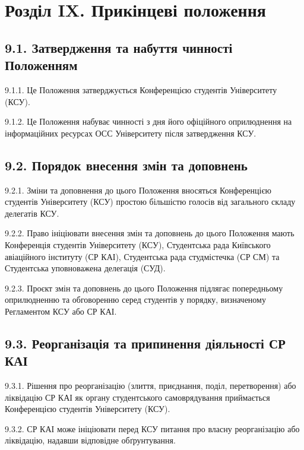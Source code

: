 \section*{Розділ IX. Прикінцеві положення}

\subsection*{9.1. Затвердження та набуття чинності Положенням}
    9.1.1. Це Положення затверджується Конференцією студентів Університету (КСУ).

    9.1.2. Це Положення набуває чинності з дня його офіційного оприлюднення на інформаційних ресурсах ОСС Університету після затвердження КСУ.

\subsection*{9.2. Порядок внесення змін та доповнень}
    9.2.1. Зміни та доповнення до цього Положення вносяться Конференцією студентів Університету (КСУ) простою більшістю голосів від загального складу делегатів КСУ.

    9.2.2. Право ініціювати внесення змін та доповнень до цього Положення мають Конференція студентів Університету (КСУ), Студентська рада Київського авіаційного інституту (СР КАІ), Студентська рада студмістечка (СР СМ) та Студентська уповноважена делегація (СУД).

    9.2.3. Проєкт змін та доповнень до цього Положення підлягає попередньому оприлюдненню та обговоренню серед студентів у порядку, визначеному Регламентом КСУ або СР КАІ.

\subsection*{9.3. Реорганізація та припинення діяльності СР КАІ}
    9.3.1. Рішення про реорганізацію (злиття, приєднання, поділ, перетворення) або ліквідацію СР КАІ як органу студентського самоврядування приймається Конференцією студентів Університету (КСУ).

    9.3.2. СР КАІ може ініціювати перед КСУ питання про власну реорганізацію або ліквідацію, надавши відповідне обґрунтування.

